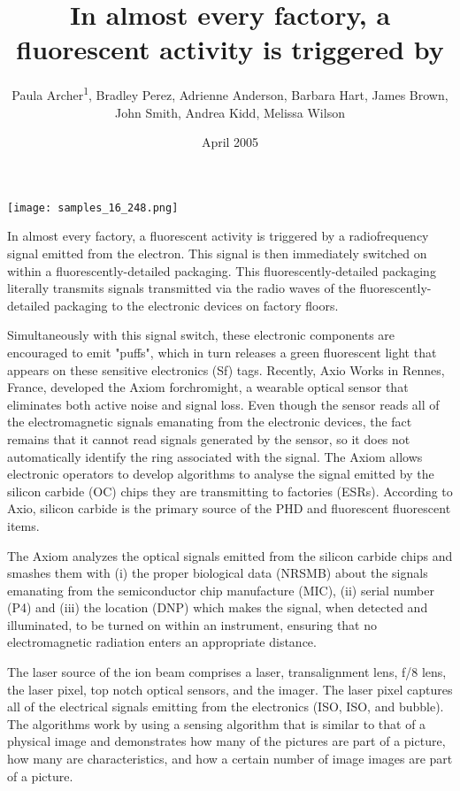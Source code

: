 \documentclass{article}
\title{In almost every factory, a fluorescent activity is triggered by}
\author{Paula Archer\textsuperscript{1},  Bradley Perez,  Adrienne Anderson,  Barbara Hart,  James Brown,  John Smith,  Andrea Kidd,  Melissa Wilson}
\affil{\textsuperscript{1}University of California, San Francisco}
\date{April 2005}
\begin{document}
\maketitle

\begin{center}
\begin{minipage}{0.75\linewidth}
\texttt{[image: samples\_16\_248.png]}
\end{minipage}
\end{center}

In almost every factory, a fluorescent activity is triggered by a radiofrequency signal emitted from the electron. This signal is then immediately switched on within a fluorescently-detailed packaging. This fluorescently-detailed packaging literally transmits signals transmitted via the radio waves of the fluorescently-detailed packaging to the electronic devices on factory floors.

Simultaneously with this signal switch, these electronic components are encouraged to emit "puffs", which in turn releases a green fluorescent light that appears on these sensitive electronics (Sf) tags. Recently, Axio Works in Rennes, France, developed the Axiom forchromight, a wearable optical sensor that eliminates both active noise and signal loss. Even though the sensor reads all of the electromagnetic signals emanating from the electronic devices, the fact remains that it cannot read signals generated by the sensor, so it does not automatically identify the ring associated with the signal. The Axiom allows electronic operators to develop algorithms to analyse the signal emitted by the silicon carbide (OC) chips they are transmitting to factories (ESRs). According to Axio, silicon carbide is the primary source of the PHD and fluorescent fluorescent items.

The Axiom analyzes the optical signals emitted from the silicon carbide chips and smashes them with (i) the proper biological data (NRSMB) about the signals emanating from the semiconductor chip manufacture (MIC), (ii) serial number (P4) and (iii) the location (DNP) which makes the signal, when detected and illuminated, to be turned on within an instrument, ensuring that no electromagnetic radiation enters an appropriate distance.

The laser source of the ion beam comprises a laser, transalignment lens, f/8 lens, the laser pixel, top notch optical sensors, and the imager. The laser pixel captures all of the electrical signals emitting from the electronics (ISO, ISO, and bubble). The algorithms work by using a sensing algorithm that is similar to that of a physical image and demonstrates how many of the pictures are part of a picture, how many are characteristics, and how a certain number of image images are part of a picture.
\end{document}
